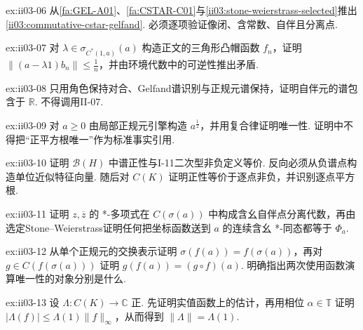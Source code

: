 \begin{FAExercise}{ex:ii03-06}
从\autoref{fa:GEL-A01}、\autoref{fa:CSTAR-C01}与\autoref{ii03:stone-weierstrass-selected}推出\autoref{ii03:commutative-cstar-gelfand}. 必须逐项验证像闭、含常数、自伴且分离点.
\end{FAExercise}

\begin{FAExercise}[正规元谱保持]{ex:ii03-07}
对 \(\displaystyle\lambda\in\sigma_{C^*(1,a)}(a)\) 构造正文的三角形凸帽函数 \(\displaystyle f_n\)，证明 \(\displaystyle\|(a-\lambda1)b_n\|\leqslant\frac{1}{n}\)，并由环境代数中的可逆性推出矛盾.
\end{FAExercise}

\begin{FAExercise}[自伴谱实性]{ex:ii03-08}
只用角色保持对合、Gelfand谱识别与正规元谱保持，证明自伴元的谱包含于 \(\displaystyle\mathbb R\). 不得调用II-07.
\end{FAExercise}

\begin{FAExercise}[正平方根]{ex:ii03-09}
对 \(\displaystyle a\geqslant0\) 由局部正规元引擎构造 \(\displaystyle a^{\frac{1}{2}}\)，并用复合律证明唯一性. 证明中不得把“正平方根唯一”作为标准事实引用.
\end{FAExercise}

\begin{FAExercise}[两种正性与连续函数空间模型]{ex:ii03-10}
证明 \(\displaystyle\mathcal B(H)\) 中谱正性与I-11二次型非负定义等价. 反向必须从负谱点构造单位近似特征向量. 随后对 \(\displaystyle C(K)\) 证明正性等价于逐点非负，并识别逐点平方根.
\end{FAExercise}

\begin{FAExercise}[正规元连续函数演算唯一性]{ex:ii03-11}
证明 \(\displaystyle z,\overline z\) 的 *-多项式在 \(\displaystyle C(\sigma(a))\) 中构成含幺自伴点分离代数，再由选定Stone--Weierstrass证明任何把坐标函数送到 \(\displaystyle a\) 的连续含幺 *-同态都等于 \(\displaystyle\Phi_a\).
\end{FAExercise}

\begin{FAExercise}[谱映射与复合律]{ex:ii03-12}
从单个正规元的交换表示证明 \(\displaystyle\sigma(f(a))=f(\sigma(a))\)，再对 \(\displaystyle g\in C(f(\sigma(a)))\) 证明 \(\displaystyle g(f(a))=(g\circ f)(a)\). 明确指出两次使用函数演算唯一性的对象分别是什么.
\end{FAExercise}

\begin{FAExercise}[正泛函范数]{ex:ii03-13}
设 \(\displaystyle\Lambda:C(K)\to\mathbb C\) 正. 先证明实值函数上的估计，再用相位 \(\displaystyle\alpha\in\mathbb T\) 证明 \(\displaystyle|\Lambda(f)|\leqslant\Lambda(1)\|f\|_\infty\)，从而得到 \(\displaystyle\|\Lambda\|=\Lambda(1)\).
\end{FAExercise}

